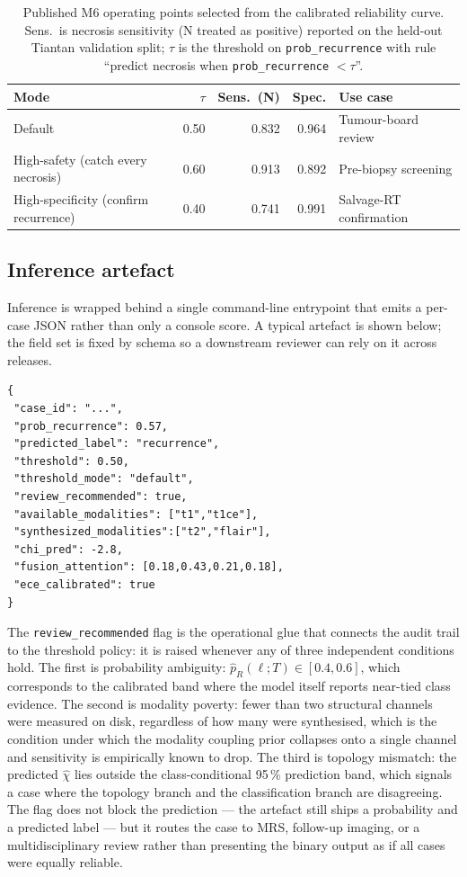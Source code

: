 \documentclass[11pt,a4paper]{article}
\begin{document}
\begin{table}[t]
\centering
\caption{Published M6 operating points selected from the calibrated reliability curve. Sens.\ is necrosis sensitivity (N treated as positive) reported on the held-out Tiantan validation split; $\tau$ is the threshold on \texttt{prob\_recurrence} with rule ``predict necrosis when \texttt{prob\_recurrence} $< \tau$''.}
\label{tab:m6thresholds}
\small
\begin{tabular}{lrrrl}
\toprule
Mode & $\tau$ & Sens.\ (N) & Spec. & Use case \\
\midrule
Default & 0.50 & 0.832 & 0.964 & Tumour-board review \\
High-safety (catch every necrosis) & 0.60 & 0.913 & 0.892 & Pre-biopsy screening \\
High-specificity (confirm recurrence) & 0.40 & 0.741 & 0.991 & Salvage-RT confirmation \\
\bottomrule
\end{tabular}
\end{table}

\subsection{Inference artefact}\label{sec:json}

Inference is wrapped behind a single command-line entrypoint that emits a per-case JSON rather than only a console score. A typical artefact is shown below; the field set is fixed by schema so a downstream reviewer can rely on it across releases.

\begin{lstlisting}
{
 "case_id": "...",
 "prob_recurrence": 0.57,
 "predicted_label": "recurrence",
 "threshold": 0.50,
 "threshold_mode": "default",
 "review_recommended": true,
 "available_modalities": ["t1","t1ce"],
 "synthesized_modalities":["t2","flair"],
 "chi_pred": -2.8,
 "fusion_attention": [0.18,0.43,0.21,0.18],
 "ece_calibrated": true
}
\end{lstlisting}

The \texttt{review\_recommended} flag is the operational glue that connects the audit trail to the threshold policy: it is raised whenever any of three independent conditions hold. The first is probability ambiguity: $\hat{p}_R(\bm{\ell};T) \in [0.4, 0.6]$, which corresponds to the calibrated band where the model itself reports near-tied class evidence. The second is modality poverty: fewer than two structural channels were measured on disk, regardless of how many were synthesised, which is the condition under which the modality coupling prior collapses onto a single channel and sensitivity is empirically known to drop. The third is topology mismatch: the predicted $\hat{\chi}$ lies outside the class-conditional 95\,\% prediction band, which signals a case where the topology branch and the classification branch are disagreeing. The flag does not block the prediction --- the artefact still ships a probability and a predicted label --- but it routes the case to MRS, follow-up imaging, or a multidisciplinary review rather than presenting the binary output as if all cases were equally reliable.
\end{document}
